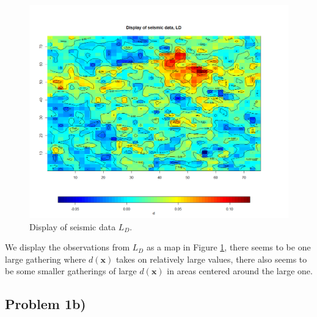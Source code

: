 \documentclass{article}
\newcommand{\vect}[1]{\ensuremath{\boldsymbol{\mathbf{#1}}}}
\begin{document}
	 \begin{figure}[H]	
	 	\begin{center} 
	 		\includegraphics[scale=0.45]{figure1.png}
	 	\end{center}
	 	\caption{Display of seismic data $L_D$.}
	 	\label{fig:1a1} 
	\end{figure}
	 
	 
	 We display the observations from $L_D$ as a map in Figure \ref{fig:1a1}, there seems to be one large gathering where $d(\vect x)$ takes on relatively large values, there also seems to be some smaller gatherings of large $d(\vect x)$ in areas centered around the large one.  

	\newpage
	\subsection*{Problem 1b)}
\end{document}
